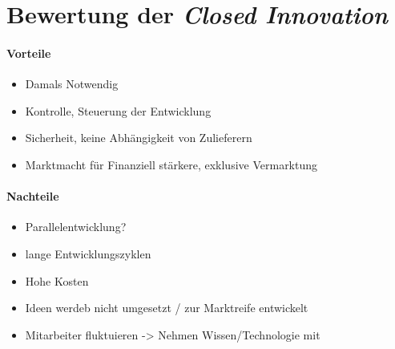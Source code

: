 \section{Bewertung der \textit{Closed Innovation}}\label{sec:vorNachteile}


\paragraph{Vorteile}\label{sec:vorNachteile-vor}

\begin{itemize}
    \item Damals Notwendig
    \item Kontrolle, Steuerung der Entwicklung
    \item Sicherheit, keine Abhängigkeit von Zulieferern
    \item Marktmacht für Finanziell stärkere, exklusive Vermarktung
\end{itemize}


\paragraph{Nachteile}\label{sec:vorNachteile-nach}

\begin{itemize}
    \item Parallelentwicklung?
    \item lange Entwicklungszyklen
    \item Hohe Kosten
    \item Ideen werdeb nicht umgesetzt / zur Marktreife entwickelt
    \item Mitarbeiter fluktuieren -> Nehmen Wissen/Technologie mit
\end{itemize}
